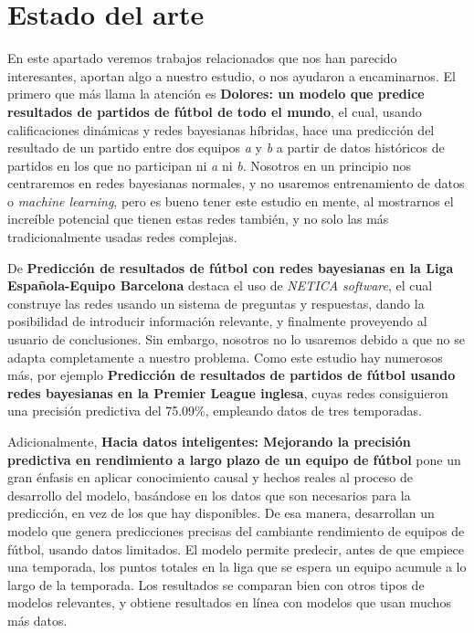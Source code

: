 \chapter{Estado del arte}
En este apartado veremos trabajos relacionados que nos han parecido interesantes, 
aportan algo a nuestro estudio, o nos ayudaron a encaminarnos. El primero que más 
llama la atención es \textbf{Dolores: un modelo que predice resultados de partidos 
de fútbol de todo el mundo}\cite{dolores}, el cual, usando calificaciones dinámicas 
y redes bayesianas híbridas, hace una predicción del resultado de un partido entre dos 
equipos  \textit{a} y \textit{b} a partir de datos históricos de partidos 
en los que no participan ni \textit{a} ni \textit{b}. Nosotros en un principio nos 
centraremos en redes bayesianas normales, y no usaremos entrenamiento de datos o 
\textit{machine learning}, pero es bueno tener este estudio en mente, al mostrarnos 
el increíble potencial que tienen estas redes también, y no solo las más tradicionalmente 
usadas redes complejas.

De  \textbf{Predicción de resultados de fútbol con redes bayesianas en la
Liga Española-Equipo Barcelona}\cite{prediction-barcelona} destaca el uso de 
\textit{NETICA software}\cite{netica}, el cual construye las redes usando un sistema de 
preguntas y respuestas, dando la posibilidad de introducir información relevante, y 
finalmente proveyendo al usuario de conclusiones. Sin embargo, nosotros no lo usaremos 
debido a que no se adapta completamente a nuestro problema. Como este estudio hay 
numerosos más, por ejemplo \textbf{Predicción de resultados de partidos de fútbol 
usando redes bayesianas en la Premier League inglesa}\cite{razali-2017}, 
cuyas redes consiguieron una precisión predictiva del 75.09\%, empleando datos de 
tres temporadas.

Adicionalmente, \textbf{Hacia datos inteligentes: Mejorando la precisión predictiva 
en rendimiento a largo plazo de un equipo de fútbol}\cite{smart-data} pone un gran énfasis 
en aplicar conocimiento causal y hechos reales al proceso de desarrollo del modelo, basándose 
en los datos que son necesarios para la predicción, en vez de los que hay disponibles.
De esa manera, desarrollan un modelo que genera predicciones precisas del cambiante rendimiento 
de equipos de fútbol, usando datos limitados. El modelo permite predecir, antes de que 
empiece una temporada, los puntos totales en la liga que se espera un equipo acumule 
a lo largo de la temporada. Los resultados se comparan bien con otros tipos de 
modelos relevantes, y obtiene resultados en línea con modelos que usan muchos más datos.

